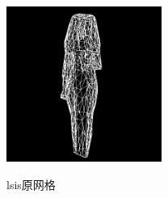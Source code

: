 \documentclass{article}
\begin{document}
	\begin{figure}[htb]
		\caption{\label{table.label} lsis原网格} \centering
		\begin{center}
			\includegraphics[width=2in]{lsis.jpg}
			\label{figure.label}
		\end{center}
	\end{figure}
\end{document}
